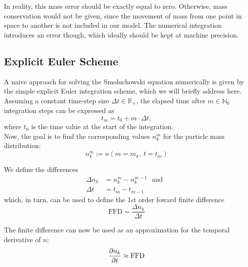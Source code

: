         In reality, this mass error should be exactly equal to zero. Otherwise, mass conservation would not be given, since the movement of mass from one point in space to another is not included in our model. 
        The numerical integration introduces an error though, which ideally should be kept at machine precision. %

    \subsection{Explicit Euler Scheme}

        A naive approach for solving the Smoluchowski equation numerically is given by the simple 
        explicit Euler integration scheme, which we will briefly address here. Assuming a constant 
        time-step size $\Delta t\in\mathbb R_+$, the elapsed time after $m\in\mathbb N_0$ integration 
        steps can be expressed as 
        \begin{equation}
            t_m
                =t_0+m\cdot\Delta t,
        \end{equation}
        where $t_0$ is the time value at the start of the integration.\\
        
        Now, the goal is to find the corresponding values $n_k^m$ for the particle mass 
        distribution:
        \begin{equation}
            n_k^m
                :=n(m=m_k,\ t=t_m)
        \end{equation}
        
        We define the differences
        \begin{align}
            \Delta n_k
                &=n_k^m-n_k^{m-1}
            \ \ \ \text{and}\ \ \
            \\
            \Delta t
                &=t_m-t_{m-1}
        \end{align}
        which, in turn, can be used to define the 1st order foward finite difference
        \begin{equation}
            \text{FFD}
                =\frac{\Delta n_k}{\Delta t}
        \end{equation}
        
        The finite difference can now be used as an approximation for the temporal derivative 
        of $n$:
        \begin{equation}
            \frac{\partial n_k}{\partial t}
                \approx\text{FFD}
        \end{equation}
        
